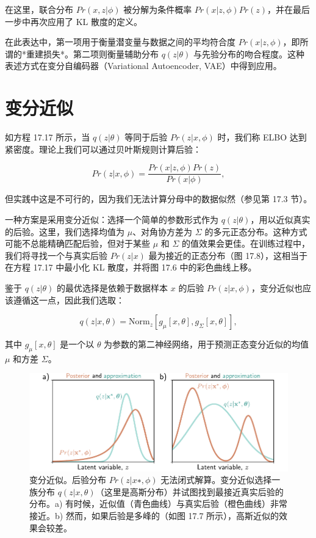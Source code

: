 \documentclass[lang=cn,newtx,10pt,scheme=chinese]{elegantbook}
\begin{document}
在这里，联合分布 \(Pr(x, z|\phi)\) 被分解为条件概率 \(Pr(x|z, \phi)Pr(z)\)，并在最后一步中再次应用了 KL 散度的定义。

在此表达中，第一项用于衡量潜变量与数据之间的平均符合度 \(Pr(x|z, \phi)\)，即所谓的*重建损失*。第二项则衡量辅助分布 \(q(z|\theta)\) 与先验分布的吻合程度。这种表述方式在变分自编码器（Variational Autoencoder, VAE）中得到应用。


\section{变分近似}
如方程 17.17 所示，当 \(q(z|\theta)\) 等同于后验 \(Pr(z|x, \phi)\) 时，我们称 ELBO 达到紧密度。理论上我们可以通过贝叶斯规则计算后验：

\begin{equation}
Pr(z|x, \phi) = \frac{Pr(x|z, \phi)Pr(z)}{Pr(x|\phi)}, 
\end{equation}

但实践中这是不可行的，因为我们无法计算分母中的数据似然（参见第 17.3 节）。

一种方案是采用变分近似：选择一个简单的参数形式作为 \(q(z|\theta)\)，用以近似真实的后验。这里，我们选择均值为 \(\mu\)、对角协方差为 \(\Sigma\) 的多元正态分布。这种方式可能不总能精确匹配后验，但对于某些 \(\mu\) 和 \(\Sigma\) 的值效果会更佳。在训练过程中，我们将寻找一个与真实后验 \(Pr(z|x)\) 最为接近的正态分布（图 17.8），这相当于在方程 17.17 中最小化 KL 散度，并将图 17.6 中的彩色曲线上移。

鉴于 \(q(z|\theta)\) 的最优选择是依赖于数据样本 \(x\) 的后验 \(Pr(z|x, \phi)\)，变分近似也应该遵循这一点，因此我们选取：

\begin{equation}
q(z|x, \theta) = \text{Norm}_z \left[ g_\mu[x, \theta], g_\Sigma[x, \theta] \right], 
\end{equation}

其中 \(g_\mu[x, \theta]\) 是一个以 \(\theta\) 为参数的第二神经网络，用于预测正态变分近似的均值 \(\mu\) 和方差 \(\Sigma\)。

\begin{figure}[ht!]
\centering
\includegraphics[width=0.7\linewidth]{PDFFigures/UDLChap17PDF/VAEVariational.pdf}
\caption{变分近似。后验分布 \(Pr(z|x∗, \phi)\) 无法闭式解算。变分近似选择一族分布 \(q(z|x, \theta)\)（这里是高斯分布）并试图找到最接近真实后验的分布。a) 有时候，近似值（青色曲线）与真实后验（橙色曲线）非常接近。b) 然而，如果后验是多峰的（如图 17.7 所示），高斯近似的效果会较差。}
\end{figure}
\end{document}
